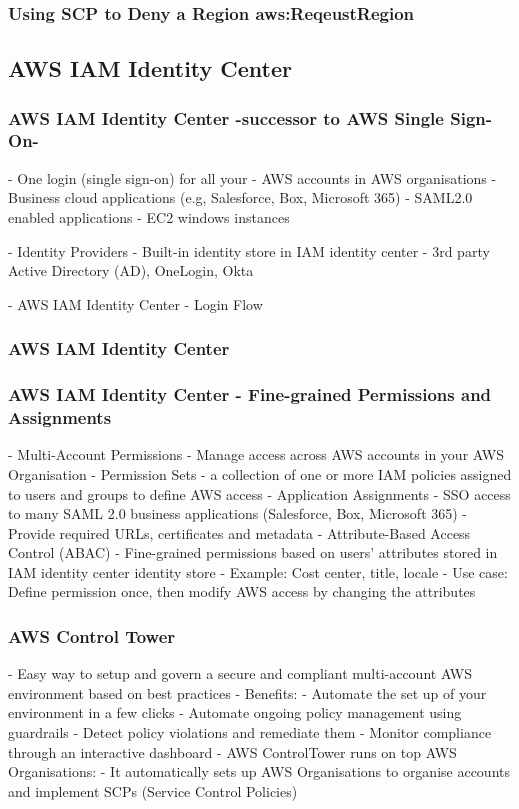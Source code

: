 \documentclass[11pt]{book}
\begin{document}
    \subsubsection{Using SCP to Deny a Region aws:ReqeustRegion}

    \subsection{AWS IAM Identity Center}

    \subsubsection{AWS IAM Identity Center -successor to AWS Single Sign-On- }
    - One login (single sign-on) for all your
    - AWS accounts in AWS organisations
    - Business cloud applications (e.g, Salesforce, Box, Microsoft 365)
    - SAML2.0 enabled applications
    - EC2 windows instances

    - Identity Providers
    - Built-in identity store in IAM identity center
    - 3rd party Active Directory (AD), OneLogin, Okta

    - AWS IAM Identity Center - Login Flow

    \subsubsection{AWS IAM Identity Center}

    \subsubsection{AWS IAM Identity Center - Fine-grained Permissions and Assignments}
    - Multi-Account Permissions
    - Manage access across AWS accounts in your AWS Organisation
    - Permission Sets - a collection of one or more IAM policies assigned to users and groups to define AWS access
    - Application Assignments
    - SSO access to many SAML 2.0 business applications (Salesforce, Box, Microsoft 365)
    - Provide required URLs, certificates and metadata
    - Attribute-Based Access Control (ABAC)
    - Fine-grained permissions based on users' attributes stored in IAM identity center identity store
    - Example: Cost center, title, locale
    - Use case: Define permission once, then modify AWS access by changing the attributes

    \subsubsection{AWS Control Tower}
    - Easy way to setup and govern a secure and compliant multi-account AWS environment based on best practices
    - Benefits:
    - Automate the set up of your environment in a few clicks
    - Automate ongoing policy management using guardrails
    - Detect policy violations and remediate them
    - Monitor compliance through an interactive dashboard
    - AWS ControlTower runs on top AWS Organisations:
    - It automatically sets up AWS Organisations to organise accounts and implement SCPs (Service Control Policies)
\end{document}

